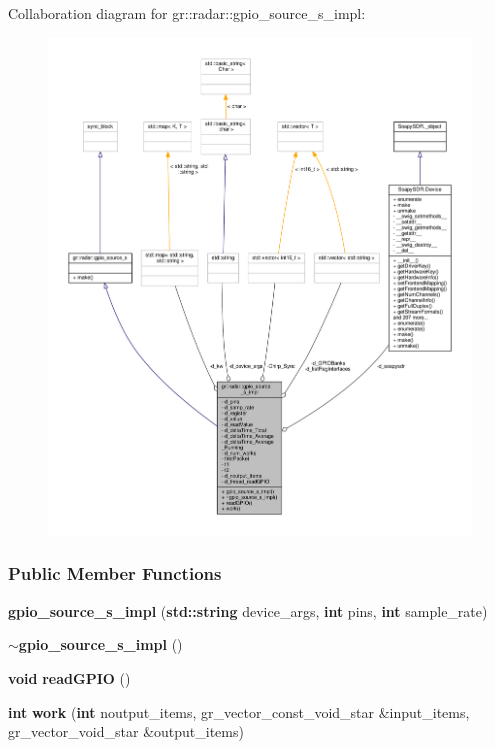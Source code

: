 Collaboration diagram for gr\+:\+:radar\+:\+:gpio\+\_\+source\+\_\+s\+\_\+impl\+:
\nopagebreak
\begin{figure}[H]
\begin{center}
\leavevmode
\includegraphics[width=350pt]{d5/dc7/classgr_1_1radar_1_1gpio__source__s__impl__coll__graph}
\end{center}
\end{figure}
\subsubsection*{Public Member Functions}
\begin{DoxyCompactItemize}
\item 
{\bf gpio\+\_\+source\+\_\+s\+\_\+impl} ({\bf std\+::string} device\+\_\+args, {\bf int} pins, {\bf int} sample\+\_\+rate)
\item 
{\bf $\sim$gpio\+\_\+source\+\_\+s\+\_\+impl} ()
\item 
{\bf void} {\bf read\+G\+P\+IO} ()
\item 
{\bf int} {\bf work} ({\bf int} noutput\+\_\+items, gr\+\_\+vector\+\_\+const\+\_\+void\+\_\+star \&input\+\_\+items, gr\+\_\+vector\+\_\+void\+\_\+star \&output\+\_\+items)
\end{DoxyCompactItemize}
